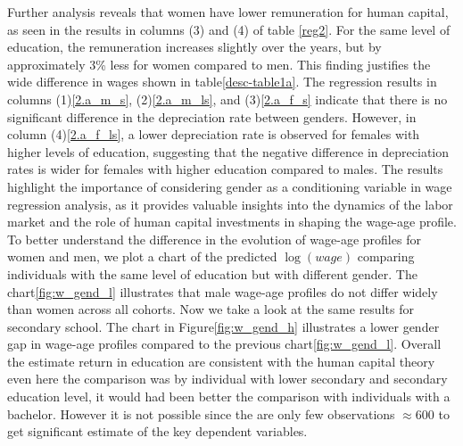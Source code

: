 \documentclass[12pt]{article}
\begin{document}
Further analysis reveals that women have lower remuneration for human capital, as seen in the results in columns (3) and (4) of table \ref{reg2}. For the same level of education, the remuneration increases slightly over the years, but by approximately 3\% less for women compared to men. This finding justifies the wide difference in wages shown in table\ref{desc-table1a}. 
The regression results in columns (1)\ref{2.a_m_s}, (2)\ref{2.a_m_ls}, and (3)\ref{2.a_f_s} indicate that there is no significant difference in the depreciation rate between genders. However, in column (4)\ref{2.a_f_ls}, a lower depreciation rate is observed for females with higher levels of education, suggesting that the negative difference in depreciation rates is wider for females with higher education compared to males. \newline
The results highlight the importance of considering gender as a conditioning variable in wage regression analysis, as it provides valuable insights into the dynamics of the labor market and the role of human capital investments in shaping the wage-age profile.
To better understand the difference in the evolution of wage-age
profiles for women and men, we plot a chart of the predicted $\log(wage)$ comparing individuals with the same level of education but with different
gender.
\newline
The chart\ref{fig:w_gend_l} illustrates that male wage-age profiles do not differ widely than women across all cohorts. 
Now we take a look at the same results for secondary school. 
\newline
The chart in Figure\ref{fig:w_gend_h} illustrates a lower gender gap in wage-age profiles compared to the previous chart\ref{fig:w_gend_l}. 
\newline
Overall the estimate return in education are consistent with the human capital theory even here the comparison was by
individual with lower secondary and secondary education level, it would had been better the comparison with individuals
with a bachelor. However it is not possible since the are only few observations $\approx 600$ to get significant estimate
of the key dependent variables.
\end{document}
